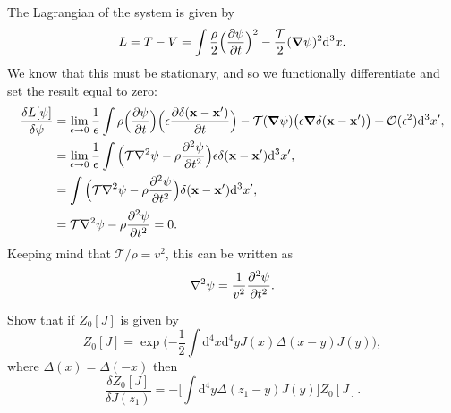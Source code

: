 \documentclass[../qft-for-the-gifted-amateur.tex]{subfiles}
\begin{document}
\begin{questions}
	\begin{solution}
		The Lagrangian of the system is given by
		\[
			L = T - V = \int\frac{\rho}{2}\Big(\frac{\partial\psi}{\partial{t}}\Big)^2 - \frac{\mathcal{T}}{2}(\grad{\psi})^2\mathrm{d}^3x.
		\]
		We know that this must be stationary, and so we functionally differentiate and set the result equal to zero:
		\begin{align*}
			\frac{\delta{L}[\psi]}{\delta\psi} &= \lim_{\epsilon\to0}\frac{1}{\epsilon}\int\rho\Big(\frac{\partial\psi}{\partial{t}}\Big)\Big(\epsilon\frac{\partial\delta(\mathbf{x} - \mathbf{x}')}{\partial{t}}\Big) - \mathcal{T}(\grad{\psi})\big(\epsilon\grad{\delta(\mathbf{x}-\mathbf{x}')}\big) + \mathcal{O}(\epsilon^2)\mathrm{d}^3x', \\
			&= \lim_{\epsilon\to0}\frac{1}{\epsilon}\int\Big(\mathcal{T}\laplacian{\psi} - \rho\frac{\partial^2\psi}{\partial{t}^2}\Big)\epsilon\delta(\mathbf{x}-\mathbf{x}')\mathrm{d}^3x', \\
			&= \int\Big(\mathcal{T}\laplacian{\psi} - \rho\frac{\partial^2\psi}{\partial{t}^2}\Big)\delta(\mathbf{x}-\mathbf{x}')\mathrm{d}^3x', \\
			&= \mathcal{T}\laplacian{\psi} - \rho\frac{\partial^2\psi}{\partial{t}^2} = 0.
		\end{align*}
		Keeping mind that $\mathcal{T}/\rho = v^2$, this can be written as
		\[
			\laplacian{\psi} = \frac{1}{v^2}\frac{\partial^2\psi}{\partial{t}^2}.
		\]
	\end{solution}
	
	\question Show that if $Z_0[J]$ is given by
	\[
		Z_0[J] = \exp\Big({-\frac{1}{2}}\int\mathrm{d}^4x\mathrm{d}^4yJ(x)\Delta(x-y)J(y)\Big),
	\]
	where $\Delta(x) = \Delta(-x)$ then
	\[
		\frac{\delta{Z_0}[J]}{\delta{J}(z_1)} = -\Big[\int\mathrm{d}^4y\Delta(z_1-y)J(y)\Big]Z_0[J].
	\]
	

\end{questions}
\end{document}

